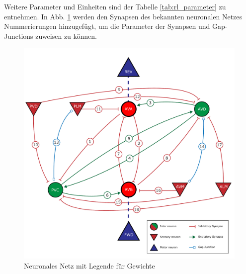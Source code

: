 	Weitere Parameter und Einheiten sind der Tabelle \ref{tab:rl_parameter} zu entnehmen. In Abb. \ref{fig:erg_rs_flow} werden den Synapsen des bekannten neuronalen Netzes Nummerierungen hinzugefügt, um die Parameter der Synapsen und Gap-Junctions zuweisen zu können.
	\begin{figure}[H]
		\centering
		\includegraphics[width=12cm]{figures/appendix/Neural_Net_v3_num_syn.pdf}
		\caption{Neuronales Netz mit Legende für Gewichte}
		\label{fig:erg_rs_flow}
	\end{figure}

